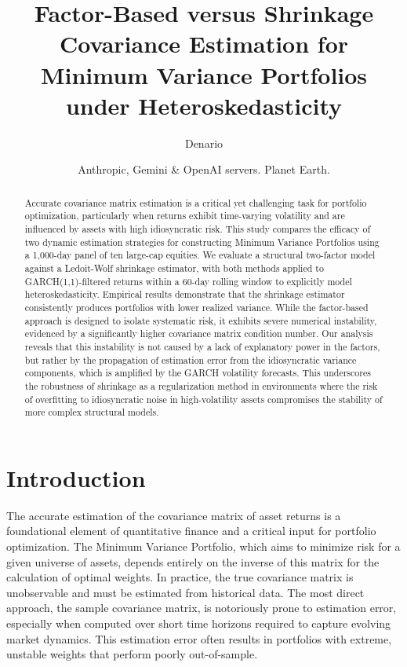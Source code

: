 \documentclass[]{article}
\begin{document}
\title{Factor-Based versus Shrinkage Covariance Estimation for Minimum Variance Portfolios under Heteroskedasticity}

\author{Denario}
\date{Anthropic, Gemini \& OpenAI servers. Planet Earth.}

\maketitle
\begin{abstract}
Accurate covariance matrix estimation is a critical yet challenging task for portfolio optimization, particularly when returns exhibit time-varying volatility and are influenced by assets with high idiosyncratic risk. This study compares the efficacy of two dynamic estimation strategies for constructing Minimum Variance Portfolios using a 1,000-day panel of ten large-cap equities. We evaluate a structural two-factor model against a Ledoit-Wolf shrinkage estimator, with both methods applied to GARCH(1,1)-filtered returns within a 60-day rolling window to explicitly model heteroskedasticity. Empirical results demonstrate that the shrinkage estimator consistently produces portfolios with lower realized variance. While the factor-based approach is designed to isolate systematic risk, it exhibits severe numerical instability, evidenced by a significantly higher covariance matrix condition number. Our analysis reveals that this instability is not caused by a lack of explanatory power in the factors, but rather by the propagation of estimation error from the idiosyncratic variance components, which is amplified by the GARCH volatility forecasts. This underscores the robustness of shrinkage as a regularization method in environments where the risk of overfitting to idiosyncratic noise in high-volatility assets compromises the stability of more complex structural models.
\end{abstract}








\section{Introduction}
\label{sec:intro}
The accurate estimation of the covariance matrix of asset returns is a foundational element of quantitative finance and a critical input for portfolio optimization. The Minimum Variance Portfolio, which aims to minimize risk for a given universe of assets, depends entirely on the inverse of this matrix for the calculation of optimal weights. In practice, the true covariance matrix is unobservable and must be estimated from historical data. The most direct approach, the sample covariance matrix, is notoriously prone to estimation error, especially when computed over short time horizons required to capture evolving market dynamics. This estimation error often results in portfolios with extreme, unstable weights that perform poorly out-of-sample.
\end{document}
